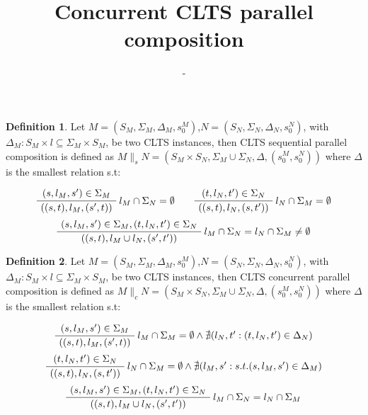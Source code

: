\documentclass{article}
\title{Concurrent CLTS parallel composition} %
\author{-} %
\date{}
\theoremstyle{definition}
\newtheorem{definition}{Definition}[section]
\newcommand{\automaton}[1]{$#1 = (S_{#1}, \Sigma_{#1}, \Delta_{#1}, s_{0}^{#1})$}
\newcommand{\ltsComposition}[3]{$#1 \parallel_{#3} #2 = (S_{#1}\times S_{#2}, \Sigma_{#1} \cup \Sigma_{#2}, \Delta, (s_{0}^{#1},s_{0}^{#2}))$}
\begin{document}
\maketitle

\setcounter{section}{1} %
\setcounter{theorem}{1} %

\begin{definition} 
Let \automaton{M},\automaton{N}, with $\Delta_M : S_M \times l \subseteq \Sigma_M \times S_M$, be two CLTS instances, then CLTS sequential parallel composition is defined as \ltsComposition{M}{N}{s} where $\Delta$ is the smallest relation s.t:
\begin{center}
	\begin{equation}
		\AxiomC{$(s, l_M, s') \in \Sigma_M $}\RightLabel{$l_M \cap \Sigma_N = \emptyset$}
		\UnaryInfC{$((s,t),l_M,(s',t))$}
		\DisplayProof
		\quad\quad
		\AxiomC{$(t, l_N, t') \in \Sigma_N $}\RightLabel{$l_N \cap \Sigma_M = \emptyset$}
		\UnaryInfC{$((s,t),l_N,(s,t'))$}
		\DisplayProof
	\end{equation}
	\begin{equation}
		\AxiomC{$(s, l_M, s') \in \Sigma_M,(t, l_N, t') \in \Sigma_N  $}\RightLabel{$l_M \cap \Sigma_N = l_N \cap \Sigma_M \neq \emptyset$}
		\UnaryInfC{$((s,t),l_M \cup l_N,(s',t'))$}
		\DisplayProof
	\end{equation}	
\end{center}
\end{definition}
\begin{definition} 
	Let \automaton{M},\automaton{N}, with $\Delta_M : S_M \times l \subseteq \Sigma_M \times S_M$, be two CLTS instances, then CLTS concurrent parallel composition is defined as \ltsComposition{M}{N}{c} where $\Delta$ is the smallest relation s.t:
	\begin{center}
		\begin{equation}
			\AxiomC{$(s, l_M, s') \in \Sigma_M $}\RightLabel{$l_M \cap \Sigma_M = \emptyset \wedge \nexists( l_N, t': (t,l_N,t') \in \Delta_N)$}
			\UnaryInfC{$((s,t),l_M,(s',t))$}
			\DisplayProof
		\end{equation}			
		\begin{equation}
			\AxiomC{$(t, l_N, t') \in \Sigma_N $}\RightLabel{$l_N \cap \Sigma_M = \emptyset \wedge \nexists( l_M, s': s.t. (s,l_M,s') \in \Delta_M)$}
			\UnaryInfC{$((s,t),l_N,(s,t'))$}
			\DisplayProof
		\end{equation}			
		\begin{equation}
		\AxiomC{$(s, l_M, s') \in \Sigma_M,(t, l_N, t') \in \Sigma_N  $}\RightLabel{$l_M \cap \Sigma_N = l_N \cap \Sigma_M$}
		\UnaryInfC{$((s,t),l_M \cup l_N,(s',t'))$}
		\DisplayProof
		\end{equation}	
	\end{center}
\end{definition}
\end{document}
